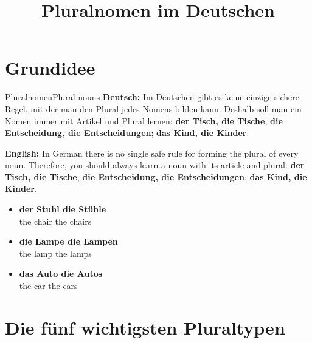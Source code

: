 \documentclass[a4paper,11pt]{article}
\title{Pluralnomen im Deutschen}
\date{}
\newcommand{\GermanText}[1]{\textbf{Deutsch: }#1\par}
\newcommand{\EnglishText}[1]{{\small\color{SoftGray}\textbf{English: }#1\par}}
\newcommand{\ExampleItem}[2]{\item \textbf{#1}\\{\small\color{SoftGray}#2}}
\begin{document}
    \maketitle
    \tableofcontents
    \newpage

\section{Grundidee}

\begin{grammarentry}{Pluralnomen}{Plural nouns}
\GermanText{Im Deutschen gibt es keine einzige sichere Regel, mit der man den Plural jedes Nomens bilden kann. Deshalb soll man ein Nomen immer mit Artikel und Plural lernen: \textbf{der Tisch, die Tische}; \textbf{die Entscheidung, die Entscheidungen}; \textbf{das Kind, die Kinder}.}
\EnglishText{In German there is no single safe rule for forming the plural of every noun. Therefore, you should always learn a noun with its article and plural: \textbf{der Tisch, die Tische}; \textbf{die Entscheidung, die Entscheidungen}; \textbf{das Kind, die Kinder}.}
\begin{exbox}
\begin{itemize}
\ExampleItem{der Stuhl \textrightarrow{} die Stühle}{the chair \textrightarrow{} the chairs}
\ExampleItem{die Lampe \textrightarrow{} die Lampen}{the lamp \textrightarrow{} the lamps}
\ExampleItem{das Auto \textrightarrow{} die Autos}{the car \textrightarrow{} the cars}
\end{itemize}
\end{exbox}
\end{grammarentry}

\section{Die fünf wichtigsten Pluraltypen}
\end{document}
